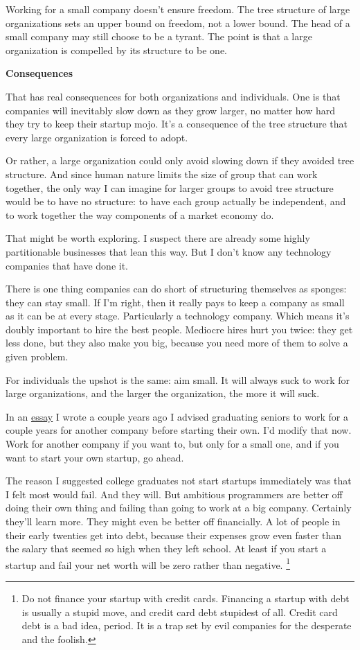 Working for a small company doesn't ensure freedom. The tree structure
of large organizations sets an upper bound on freedom, not a lower
bound. The head of a small company may still choose to be a tyrant. The
point is that a large organization is compelled by its structure to be
one.

\textbf{Consequences}

That has real consequences for both organizations and individuals. One
is that companies will inevitably slow down as they grow larger, no
matter how hard they try to keep their startup mojo. It's a consequence
of the tree structure that every large organization is forced to adopt.

Or rather, a large organization could only avoid slowing down if they
avoided tree structure. And since human nature limits the size of group
that can work together, the only way I can imagine for larger groups to
avoid tree structure would be to have no structure: to have each group
actually be independent, and to work together the way components of a
market economy do.

That might be worth exploring. I suspect there are already some highly
partitionable businesses that lean this way. But I don't know any
technology companies that have done it.

There is one thing companies can do short of structuring themselves as
sponges: they can stay small. If I'm right, then it really pays to keep
a company as small as it can be at every stage. Particularly a
technology company. Which means it's doubly important to hire the best
people. Mediocre hires hurt you twice: they get less done, but they also
make you big, because you need more of them to solve a given problem.

For individuals the upshot is the same: aim small. It will always suck
to work for large organizations, and the larger the organization, the
more it will suck.

In an \href{start.html}{essay} I wrote a couple years ago I advised
graduating seniors to work for a couple years for another company before
starting their own. I'd modify that now. Work for another company if you
want to, but only for a small one, and if you want to start your own
startup, go ahead.

The reason I suggested college graduates not start startups immediately
was that I felt most would fail. And they will. But ambitious
programmers are better off doing their own thing and failing than going
to work at a big company. Certainly they'll learn more. They might even
be better off financially. A lot of people in their early twenties get
into debt, because their expenses grow even faster than the salary that
seemed so high when they left school. At least if you start a startup
and fail your net worth will be zero rather than negative.
\footnote{Do not finance your startup with credit cards. Financing a
startup with debt is usually a stupid move, and credit card debt
stupidest of all. Credit card debt is a bad idea, period. It is a trap
set by evil companies for the desperate and the foolish.}

